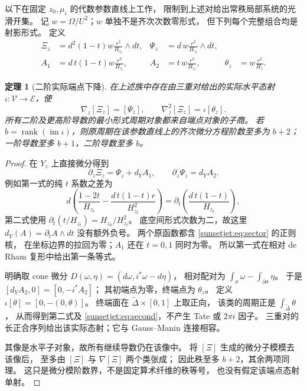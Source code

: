 \documentclass[11pt,a4paper,oneside]{ctexart}
\theoremstyle{cnplain}
\newtheorem{theorem}{定理}[section]
\theoremstyle{definition}
\theoremstyle{remark}
\newcommand{\im}{\operatorname{im}}
\numberwithin{equation}{section}
\begin{document}
以下在固定 $z_0,\mu_i$ 的代数参数直线上工作，
限制到上述对给出常秩局部系统的光滑开集。
记 $w=\Omega/U^2$；$w$ 单独不是齐次次数零形式，
但下列每个完整组合均是射影形式。
定义
\begin{align}
 \Xi_z&=d^2(1-t)w\frac{r^2}{H_{z_t}}\wedge dt,&
 \Psi_z&=d\,w\frac{r^2}{H_{z_t}}\wedge dt,\label{sunsetjet:eq:forms}\\
 A_1&=d\,t(1-t)w\frac{r^2}{H_{z_t}},&
 A_2&=t\,w\frac{r^2}{H_{z_t}},&
 \theta_z&=w\frac{r^2}{H_z}.\label{sunsetjet:eq:primitives}
\end{align}

\begin{theorem}[二阶实际端点下降]\label{sunsetjet:thm:descent}
在上述族中存在由三重对给出的实际水平态射
$\iota:\mathcal V\to\mathcal E$，使
\begin{equation}\label{sunsetjet:eq:descent}
 \nabla_z[\Xi_z]=[\Psi_z],\qquad
 \nabla_z^2[\Xi_z]=\iota[\theta_z].
\end{equation}
所有二阶及更高阶导数的最小形式周期对象都来自端点对象的子商。
若 $b=\operatorname{rank}(\im\iota)$，则原周期在该参数直线上的齐次微分方程阶数至多为 $b+2$；
一阶导数至多 $b+1$，二阶导数至多 $b$。
\end{theorem}
\begin{proof}
在 $Y_z$ 上直接微分得到
\begin{equation}\label{sunsetjet:eq:exact}
 \partial_z\Xi_z=\Psi_z+d_YA_1,\qquad
 \partial_z\Psi_z=d_YA_2.
\end{equation}
例如第一式的纯 $t$ 系数之差为
\[
 d\left(\frac{1-2t}{H_{z_t}}
          -\frac{d\,t(1-t)r}{H_{z_t}^2}\right)
   =\partial_t\left(\frac{d\,t(1-t)}{H_{z_t}}\right),
\]
第二式使用
$\partial_t(t/H_{z_t})=H_{z_0}/H_{z_t}^2$。
底空间形式次数为二，故这里 $d_Y(A)=\partial_t A\wedge dt$ 没有额外负号。
两个原函数都含 \eqref{sunsetjet:eq:sector} 的正则核，
在坐标边界的拉回为零；$A_1$ 还在 $t=0,1$ 同时为零。
所以第一式在相对 de Rham 复形中给出第一条等式。

明确取 cone 微分
$D(\omega,\eta)=(d\omega,i^*\omega-d\eta)$，
相对配对为 $\int_\sigma\omega-\int_{\partial\sigma}\eta$。
于是 $[d_YA_2,0]=[0,-i^*A_2]$；
其初端点为零，终端点为 $\theta_z$。
定义 $\iota[\theta]=[0,-(0,\theta)]$。
终端面在 $\widetilde\Delta\times[0,1]$ 上取正向，
该类的周期正是 $\int_{\widetilde\Delta}\theta$，
从而得到第二式及 \eqref{sunsetjet:eq:second}，不产生 Tate 或 $2\pi i$ 因子。
三重对的长正合序列给出该实际态射；它与 Gauss--Manin 连接相容。

其像是水平子对象，故所有继续导数仍在该像中。
将 $[\Xi]$ 生成的微分子模模去该像后，
至多由 $[\Xi]$ 与 $\nabla[\Xi]$ 两个类张成；
因此秩至多 $b+2$，其余两项同理。
这只是微分模阶数界，不是固定算术纤维的秩等号，
也没有假定该端点态射单射。
\end{proof}
\end{document}

